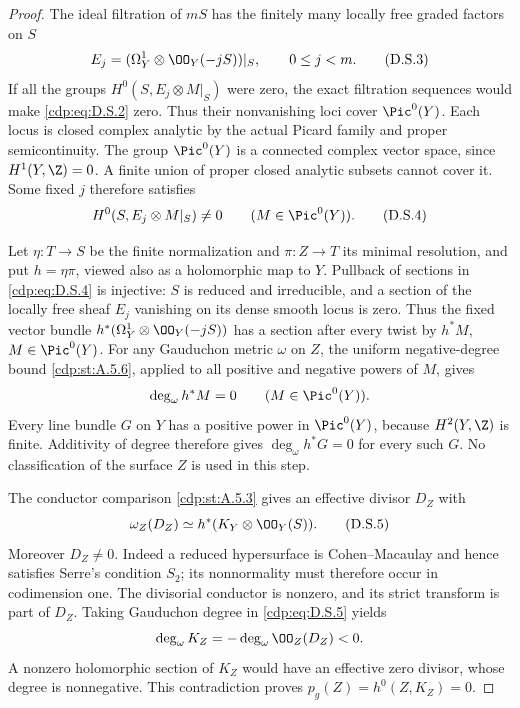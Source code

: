 \begin{proof}
The ideal filtration of $mS$ has the finitely many locally free
graded factors on $S$
\[
 E_j=(\Omega_Y^1\otimes\OO_Y(-jS))|_S,
 \qquad 0\le j<m.
 \tag{D.S.3}\label{cdp:eq:D.S.3}
\]
If all the groups $H^0(S,E_j\otimes M|_S)$ were zero, the exact
filtration sequences would make \eqref{cdp:eq:D.S.2} zero. Thus their
nonvanishing loci cover $\Pic^0(Y)$. Each locus is closed
complex analytic by the actual Picard family and proper
semicontinuity. The group $\Pic^0(Y)$ is a connected complex
vector space, since $H^1(Y,\Z)=0$. A finite union of proper
closed analytic subsets cannot cover it. Some fixed $j$
therefore satisfies
\[
 H^0(S,E_j\otimes M|_S)\ne0
 \qquad(M\in\Pic^0(Y)).
 \tag{D.S.4}\label{cdp:eq:D.S.4}
\]

Let $\eta:T\to S$ be the finite normalization and
$\pi:Z\to T$ its minimal resolution, and put $h=\eta\pi$,
viewed also as a holomorphic map to $Y$.
Pullback of sections in \eqref{cdp:eq:D.S.4} is injective: $S$ is reduced
and irreducible, and a section of the locally free sheaf $E_j$
vanishing on its dense smooth locus is zero. Thus the fixed
vector bundle $h^*(\Omega_Y^1\otimes\OO_Y(-jS))$ has a
section after every twist by $h^*M$, $M\in\Pic^0(Y)$.
For any Gauduchon metric $\omega$ on $Z$, the uniform
negative-degree bound \ref{cdp:st:A.5.6}, applied to all positive and
negative powers of $M$, gives
\[
 \deg_\omega h^*M=0\qquad(M\in\Pic^0(Y)).
\]
Every line bundle $G$ on $Y$ has a positive power in
$\Pic^0(Y)$, because $H^2(Y,\Z)$ is finite. Additivity of
degree therefore gives $\deg_\omega h^*G=0$ for every such
$G$. No classification of the surface $Z$ is used in this step.

The conductor comparison \ref{cdp:st:A.5.3} gives an effective divisor
$D_Z$ with
\[
 \omega_Z(D_Z)\simeq h^*(K_Y\otimes\OO_Y(S)).
 \tag{D.S.5}\label{cdp:eq:D.S.5}
\]
Moreover $D_Z\ne0$. Indeed a reduced hypersurface is
Cohen--Macaulay and hence satisfies Serre's condition $S_2$;
its nonnormality must therefore occur in codimension one.
The divisorial conductor is nonzero, and its strict transform
is part of $D_Z$.
Taking Gauduchon degree in \eqref{cdp:eq:D.S.5} yields
\[
 \deg_\omega K_Z=-\deg_\omega\OO_Z(D_Z)<0.
\]
A nonzero holomorphic section of $K_Z$ would have an effective
zero divisor, whose degree is nonnegative. This contradiction
proves $p_g(Z)=h^0(Z,K_Z)=0$.


\end{proof}
